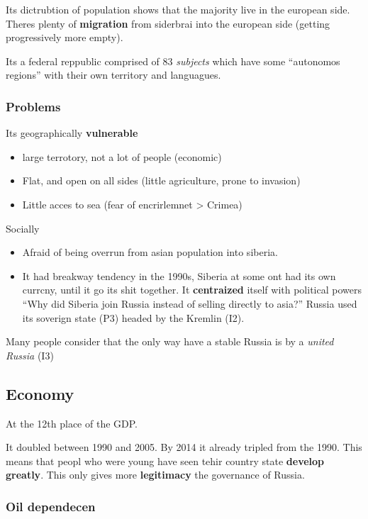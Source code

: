 Its dictrubtion of population shows that the majority live in the european side. Theres plenty of \textbf{migration} from siderbrai into the european side (getting progressively more empty).

Its a federal reppublic comprised of 83 \textit{subjects} which have some ``autonomos regions'' with their own territory and languagues.

\subsubsection{Problems}

Its geographically \textbf{vulnerable}
\begin{itemize}
	\item large terrotory, not a lot of people (economic)
	\item Flat, and open on all sides (little agriculture, prone to invasion)
	\item Little acces to sea (fear of encrirlemnet > Crimea)
\end{itemize}

Socially
\begin{itemize}
	\item Afraid of being overrun from asian population into siberia.
	\item It had breakway tendency in the 1990s, Siberia at some ont had its own currcny, until it go its shit together. It \textbf{centraized} itself with political powers
	``Why did Siberia join Russia instead of selling directly to asia?'' Russia used its soverign state (P3) headed by the Kremlin (I2).
\end{itemize}


Many people consider that the only way have a stable Russia is by a \textit{united Russia} (I3)


\subsection{Economy}

At the 12th place of the GDP.

It doubled between 1990 and 2005. By 2014 it already tripled from the 1990. This means that peopl who were young have seen tehir country state \textbf{develop greatly}. This only gives more \textbf{legitimacy} the governance of Russia.

\subsubsection{Oil dependecen}

